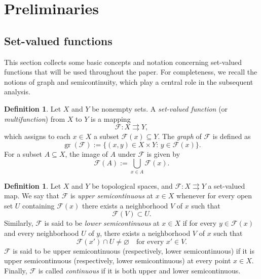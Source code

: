 \documentclass[11pt]{elsarticle}
\theoremstyle{definition}
\newtheorem{definition}[theorem]{Definition}
\theoremstyle{remark}
\numberwithin{equation}{section}
\def\gr{\operatorname{gr}}
\begin{document}
	\section{Preliminaries}
	\label{sec:preliminaries}
	
	\subsection{Set-valued functions}
	
	This section collects some basic concepts and notation concerning set-valued functions that will be used throughout the paper. For completeness, we recall the notions of graph and semicontinuity, which play a central role in the subsequent analysis.
	
	\begin{definition}
		Let $X$ and $Y$ be nonempty sets. A \emph{set-valued function} (or \emph{multifunction}) from $X$ to $Y$ is a mapping
		\[
		\mathcal{F}:X \rightrightarrows Y,
		\]
		which assigns to each $x\in X$ a subset $\mathcal{F}(x)\subseteq Y$. The \emph{graph} of $\mathcal{F}$ is defined as
		\[
		\gr(\mathcal{F}):=\{(x,y)\in X\times Y:\, y\in \mathcal{F}(x)\}.
		\]
		For a subset $A\subseteq X$, the image of $A$ under $\mathcal{F}$ is given by
		\[
		\mathcal{F}(A):=\bigcup_{x\in A}\mathcal{F}(x).
		\]
	\end{definition}
	
	
	\begin{definition}
		Let $X$ and $Y$ be topological spaces, and
		$\mathcal{F}:X\rightrightarrows Y$ a set-valued map.
		We say that $\mathcal{F}$ is \emph{upper semicontinuous} at $x\in X$ whenever for every open set
		$U$ containing $\mathcal{F}(x)$ there exists a neighborhood $V$ of $x$ such that
		\[
		\mathcal{F}(V)\subset U.
		\]
		Similarly, $\mathcal{F}$ is said to be \emph{lower semicontinuous} at $x\in X$
		if for every $y\in \mathcal{F}(x)$ and every neighborhood $U$ of $y$, there exists a neighborhood $V$ of $x$ such that
		\[
		\mathcal{F}(x') \cap U \neq \varnothing \quad \text{for every } x' \in V.
		\] 
		$\mathcal{F}$ is said to be upper semicontinuous (respectively, lower semicontinuous) if it is upper semicontinuous (respectively, lower semicontinuous) at every point $x\in X$. 
		Finally, $\mathcal{F}$ is called \emph{continuous} if it is both upper and
		lower semicontinuous.
	\end{definition}
	
\end{document}
